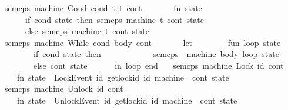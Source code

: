 \begin{isabellebody}
\isanewline
\ \ {\isacharbar}{\kern0pt}\ sem{\isacharunderscore}{\kern0pt}cps\ machine\ {\isacharparenleft}{\kern0pt}Cond\ {\isacharparenleft}{\kern0pt}cond{\isacharcomma}{\kern0pt}\ t{}{\isacharcomma}{\kern0pt}\ t{}{\isacharparenright}{\kern0pt}{\isacharparenright}{\kern0pt}\ cont\ {\isacharequal}{\kern0pt}\isanewline
\ \ \ \ \ \ {\isacharparenleft}{\kern0pt}fn\ state\ {\isacharequal}{\kern0pt}{\isachargreater}{\kern0pt}\isanewline
\ \ \ \ \ \ \ \ if\ cond\ state\ then\ sem{\isacharunderscore}{\kern0pt}cps\ machine\ t{}\ cont\ state\isanewline
\ \ \ \ \ \ \ \ else\ sem{\isacharunderscore}{\kern0pt}cps\ machine\ t{}\ cont\ state{\isacharparenright}{\kern0pt}\isanewline
\isanewline
\ \ {\isacharbar}{\kern0pt}\ sem{\isacharunderscore}{\kern0pt}cps\ machine\ {\isacharparenleft}{\kern0pt}While\ {\isacharparenleft}{\kern0pt}cond{\isacharcomma}{\kern0pt}\ body{\isacharparenright}{\kern0pt}{\isacharparenright}{\kern0pt}\ cont\ {\isacharequal}{\kern0pt}\isanewline
\ \ \ \ \ \ {\isacharparenleft}{\kern0pt}let\isanewline
\ \ \ \ \ \ \ \ fun\ loop\ state\ {\isacharequal}{\kern0pt}\isanewline
\ \ \ \ \ \ \ \ \ \ if\ cond\ state\ then\isanewline
\ \ \ \ \ \ \ \ \ \ \ \ sem{\isacharunderscore}{\kern0pt}cps\ \ machine\ body\ loop\ state\isanewline
\ \ \ \ \ \ \ \ \ \ else\ cont\ state\isanewline
\ \ \ \ \ \ in\ loop\ end{\isacharparenright}{\kern0pt}\isanewline
\isanewline
\ \ {\isacharbar}{\kern0pt}\ sem{\isacharunderscore}{\kern0pt}cps\ machine\ {\isacharparenleft}{\kern0pt}Lock\ id{\isacharparenright}{\kern0pt}\ cont\ {\isacharequal}{\kern0pt}\isanewline
\ \ \ \ \ \ {\isacharparenleft}{\kern0pt}fn\ state\ {\isacharequal}{\kern0pt}{\isachargreater}{\kern0pt}\ LockEvent\ {\isacharparenleft}{\kern0pt}id{\isacharcomma}{\kern0pt}\ get{\isacharunderscore}{\kern0pt}lock{\isacharunderscore}{\kern0pt}id\ id\ machine{\isacharparenright}{\kern0pt}\ {\isacharcolon}{\kern0pt}{\isacharcolon}{\kern0pt}\ cont\ state{\isacharparenright}{\kern0pt}\isanewline
\isanewline
\ \ {\isacharbar}{\kern0pt}\ sem{\isacharunderscore}{\kern0pt}cps\ machine\ {\isacharparenleft}{\kern0pt}Unlock\ id{\isacharparenright}{\kern0pt}\ cont\ {\isacharequal}{\kern0pt}\isanewline
\ \ \ \ \ \ {\isacharparenleft}{\kern0pt}fn\ state\ {\isacharequal}{\kern0pt}{\isachargreater}{\kern0pt}\ UnlockEvent\ {\isacharparenleft}{\kern0pt}id{\isacharcomma}{\kern0pt}\ get{\isacharunderscore}{\kern0pt}lock{\isacharunderscore}{\kern0pt}id\ id\ machine{\isacharparenright}{\kern0pt}\ {\isacharcolon}{\kern0pt}{\isacharcolon}{\kern0pt}\ cont\ state{\isacharparenright}{\kern0pt}\isanewline

\end{isabellebody}
